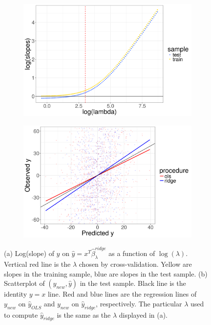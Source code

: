 \documentclass[main]{subfiles}
\begin{document}
\begin{figure}[!h]
	\centering
	\begin{subfigure}[t]{0.45\textwidth}
		\includegraphics[width = \textwidth]{./ridge_figures/slope_vs_lambda.png}
    \subcaption{}
	\end{subfigure}
	\quad
	\begin{subfigure}[t]{0.45\textwidth}
		\includegraphics[width = \textwidth]{./ridge_figures/y_obs_vs_pred.png}
    \subcaption{}
	\end{subfigure}
	\caption{(a) Log(slope) of $y$ on $\hat y = x^T\hat\beta^{ridge}_\lambda$ as a function of $\log(\lambda)$.
	Vertical red line is the $\lambda$
  chosen by cross-validation. Yellow are slopes in the training sample, blue are slopes in the test sample.
  (b) Scatterplot of $(y_{new}, \hat y)$ in the test sample. Black line is the identity $y = x$ line.
	Red and blue lines are the regression
  lines of $y_{new}$ on $\hat y_{OLS}$ and $y_{new}$ on $\hat y_{ridge}$, respectively. The particular $\lambda$
	used to compute $\hat y_{ridge}$ is the same as the $\lambda$ displayed in (a). }
	\label{fig:ridge_slope_vs_lambda}
\end{figure}
\end{document}
